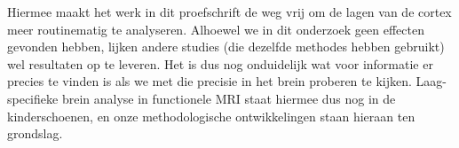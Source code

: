 Hiermee maakt het werk in dit proefschrift de weg vrij om de lagen van de cortex meer routinematig te analyseren. Alhoewel we in dit onderzoek geen effecten gevonden hebben, lijken andere studies (die dezelfde methodes hebben gebruikt) wel resultaten op te leveren. Het is dus nog onduidelijk wat voor informatie er precies te vinden is als we met die precisie in het brein proberen te kijken. Laag-specifieke brein analyse in functionele MRI staat hiermee dus nog in de kinderschoenen, en onze methodologische ontwikkelingen staan hieraan ten grondslag.




